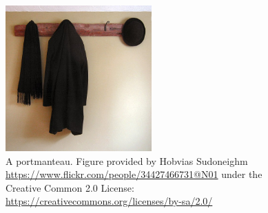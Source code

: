 \begin{figure}
    \centering
    \includegraphics[width=0.5\textwidth]{figures/hanger.jpg}
    \caption{A portmanteau. Figure provided by Hobvias Sudoneighm \url{https://www.flickr.com/people/34427466731@N01} under the Creative Common 2.0 License: \url{https://creativecommons.org/licenses/by-sa/2.0/}}
\end{figure}

